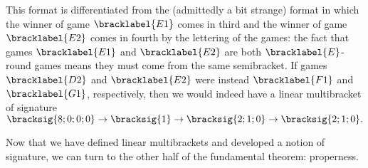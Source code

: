 {     

    This format is differentiated from the (admittedly a bit strange) format in which the winner of game $\bracklabel{E1}$ comes in third and the winner of game $\bracklabel{E2}$ comes in fourth by the lettering of the games: the fact that games $\bracklabel{E1}$ and $\bracklabel{E2}$ are both $\bracklabel{E}$-round games means they must come from the same semibracket. If games $\bracklabel{D2}$ and $\bracklabel{E2}$ were instead $\bracklabel{F1}$ and $\bracklabel{G1}$, respectively, then we would indeed have a linear multibracket of signature $\bracksig{8;0;0;0} \to \bracksig{1} \to \bracksig{2;1;0} \to \bracksig{2;1;0}.$

    Now that we have defined linear multibrackets and developed a notion of signature, we can turn to the other half of the fundamental theorem: properness.
}